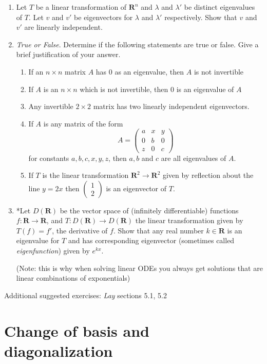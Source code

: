 \documentclass[12pt]{article}
\numberwithin{equation}{subsection}
\numberwithin{figure}{subsection}
\theoremstyle{note}
\newcommand{\R}{\mathbf{R}}
\begin{document}
\begin{enumerate}[label=\arabic*.]
	\item Let $T$ be a linear transformation of $\R^n$ and $\lambda$ and $\lambda'$ be distinct eigenvalues of $T$. Let $v$ and $v'$ be eigenvectors for $\lambda$ and $\lambda'$ respectively. Show that $v$ and $v'$ are linearly independent. 
	\item \textit{True or False}. Determine if the following statements are true or false. Give a brief justification of your answer. 
	\begin{enumerate}
		\item If an $n\times n$ matrix $A$ has $0$ as an eigenvalue, then $A$ is not invertible
		\item If $A$ is an $n \times n$ which is not invertible, then $0$ is an eigenvalue of $A$
		\item Any invertible $2\times 2$ matrix has  two  linearly independent eigenvectors.
		\item If $A$ is any matrix of the form \[A=\begin{pmatrix} a & x & y \\ 0 & b & 0 \\ z & 0 & c\end{pmatrix}\] for constants $a,b,c,x,y,z$, then $a,b$ and $c$ are all eigenvalues of $A$.
		\item If $T$ is the linear transformation $\mathbf{R}^2\to\mathbf{R}^2$ given by reflection about the line $y=2x$ then $\begin{pmatrix} 1 \\ 2\end{pmatrix}$ is an eigenvector of $T$.
		\end{enumerate}
		
		\item *Let $D(\R)$ be the vector space of (infinitely differentiable) functions $f\colon \R \to \R$, and $T\colon D(\R)\to D(\R)$ the linear transformation given by $T(f)=f'$, the derivative of $f$. Show that any real number $k\in \R$ is an eigenvalue for $T$ and has corresponding eigenvector (sometimes called \textit{eigenfunction}) given by $e^{kx}$. 
		
		(Note: this is why when solving linear ODEs you always get solutions that are linear combinations of exponentials)
\end{enumerate}

Additional suggested exercises: \textit{Lay} sections 5.1, 5.2


\section[Diagonalization]{Change of basis and diagonalization}
\end{document}
